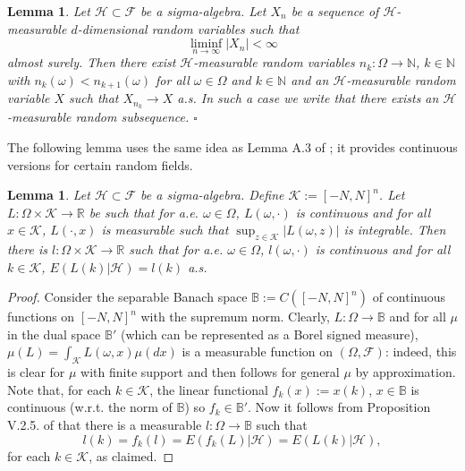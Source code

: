 \documentclass[a4paper]{article}
\newtheorem{lemma}[theorem]{Lemma}
\begin{document}
\begin{lemma}\label{randomsub} Let $\mathcal{H}\subset\mathcal{F}$ be a sigma-algebra. 
Let $X_n$ be a sequence of $\mathcal{H}$-measurable $d$-dimensional random variables such that
\begin{equation}\label{raffaello}
\liminf_{n\to\infty}|X_n|<\infty
\end{equation}
almost surely. Then there exist
$\mathcal{H}$-measurable random variables 
$n_k:\Omega\to\mathbb{N}$, $k\in\mathbb{N}$ with $n_k(\omega)<n_{k+1}(\omega)$ for all $\omega\in\Omega$
and $k\in\mathbb{N}$ and an $\mathcal{H}$-measurable 
random variable $X$ such that $X_{n_k}\to X$ a.s. In such a case we write that 
\emph{there exists an $\mathcal{H}$-measurable
random subsequence}. \hfill $\square$
\end{lemma}


The following lemma uses the same idea as Lemma A.3 of \cite{lukasz}; it provides continuous versions
for certain random fields.

\begin{lemma}\label{szeder} Let $\mathcal{H}\subset\mathcal{F}$ be a sigma-algebra.
Define $\mathcal{K}:=[-N,N]^{n}$.
Let $L:\Omega\times \mathcal{K}\to \mathbb{R}$ be such that for a.e. $\omega\in\Omega$,
$L(\omega,\cdot)$ is continuous and for all $x\in \mathcal{K}$, $L(\cdot,x)$ is
measurable such that $\sup_{z\in \mathcal{K}} |L(\omega,z)|$ is integrable.
Then there is $l:\Omega\times \mathcal{K}\to \mathbb{R}$ such that for a.e. $\omega\in\Omega$,
$l(\omega,\cdot)$ is continuous and for all $k\in \mathcal{K}$, $E(L(k)|\mathcal{H})=l(k)$ a.s.
\end{lemma}
\begin{proof}
Consider the separable Banach space 
$\mathbb{B}:=C([-N,N]^{n})$ of continuous functions on $[-N,N]^{n}$ with the supremum norm. Clearly, $L:\Omega\to \mathbb{B}$ and
for all $\mu$ in the dual space $\mathbb{B}'$ (which can be represented as a Borel signed measure), 
$\mu(L)=\int_{\mathcal{K}} L(\omega,x)\mu(dx)$
is a measurable function on $(\Omega,\mathcal{F})$: indeed, this is clear for
$\mu$ with finite support and then follows for general $\mu$ by approximation.
Note that, for each $k\in \mathcal{K}$, the linear functional
$f_k(x):=x(k)$, $x\in \mathbb{B}$ is continuous (w.r.t. the norm of $\mathbb{B}$) so
$f_k\in\mathbb{B}'$. Now it follows
from Proposition V.2.5. of \cite{neveu} that there is a measurable $l:\Omega\to \mathbb{B}$
such that $$
l(k)=f_k(l)=E(f_k(L)|\mathcal{H})=E(L(k)|\mathcal{H}),
$$ 
for each $k\in \mathcal{K}$, as claimed.
\end{proof}
\end{document}
